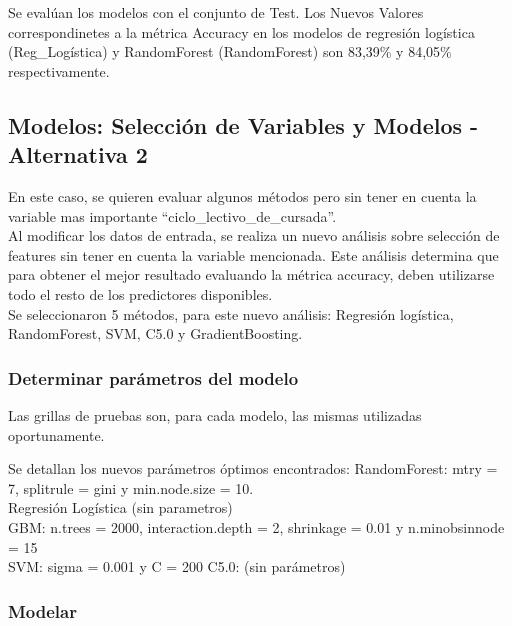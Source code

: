 Se evalúan los modelos con el conjunto de Test.
Los Nuevos Valores correspondinetes a la métrica Accuracy en los modelos de regresión logística (Reg\_Logística) y RandomForest (RandomForest) son 83,39\% y 84,05\% respectivamente. %

\subsection{Modelos: Selección de Variables y Modelos - Alternativa 2}

En este caso, se quieren evaluar algunos métodos pero sin tener en cuenta la variable mas importante ``ciclo\_lectivo\_de\_cursada''.\\
Al modificar los datos de entrada, se realiza un nuevo análisis sobre selección de features sin tener en cuenta la variable mencionada. Este análisis determina que para obtener el mejor resultado evaluando la métrica accuracy, deben utilizarse todo el resto de los predictores disponibles. \\


Se seleccionaron 5 métodos, para este nuevo análisis: Regresión logística, RandomForest, SVM, C5.0 y GradientBoosting.


\subsubsection{Determinar parámetros del modelo}

Las grillas de pruebas son, para cada modelo, las mismas utilizadas oportunamente.

Se detallan los nuevos parámetros óptimos encontrados: 
RandomForest: mtry = 7, splitrule = gini y min.node.size = 10.
\\
Regresión Logística (sin parametros)\\
GBM: n.trees = 2000, interaction.depth = 2, shrinkage = 0.01
y n.minobsinnode = 15\\
SVM: sigma = 0.001 y C = 200
C5.0: (sin parámetros)


\subsubsection{Modelar}

